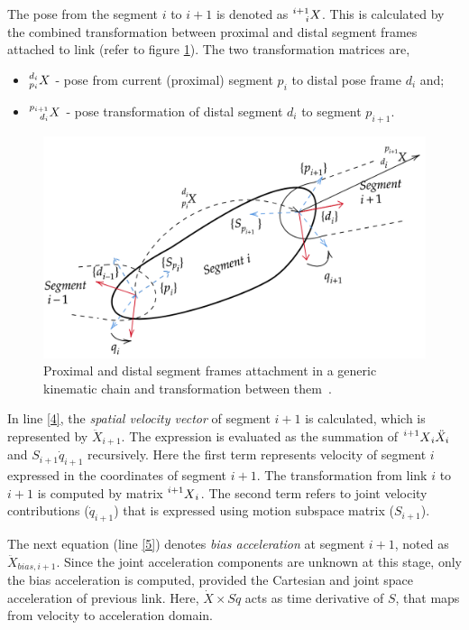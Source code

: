 The pose from the segment $i$ to $i+1$ is denoted as $\prescript{i+1}{i}{X}$. This is calculated by the combined transformation between proximal and distal segment frames attached to link (refer to figure \ref{fig:pose}). The two transformation matrices are, \begin{itemize}
	\item $\prescript{d_i}{p_i}{X}$ - pose from current (proximal) segment $p_i$ to distal pose frame $d_i$ and;
	\item $\prescript{p_{i+1}}{d_i}{X}$ - pose transformation of distal segment $d_i$ to segment $p_{i+1}$. 
\end{itemize} 

\begin{figure}[h!]
		\label{fig:pose}
	\centering
	\includegraphics[scale=0.33]{images/pose.png}
	\caption{Proximal and distal segment frames attachment in a generic kinematic chain and transformation between them~\cite{shakhimardanov2015composable}.}

\end{figure}

In line \ref{4}, the \textit{spatial velocity vector} of segment $i+1$ is calculated, which is represented by $\ddot{X}_{i+1}$. The expression is evaluated as the summation of $\prescript{i+1}{}{X}_i\ddot{X}_i$ and  $S_{i+1}\dot{q}_{i+1}$ recursively. Here the first term represents velocity of segment $i$ expressed in the coordinates of segment $i+1$. The transformation from link $i$ to $i+1$ is computed by matrix $\prescript{i+1}{}{X}_{i}$. The second term refers to joint velocity contributions ($\dot{q}_{i+1}$) that is expressed using motion subspace matrix ($S_{i+1}$).

	The next equation (line \ref{5}) denotes \textit{bias acceleration} at segment $i+1$, noted as $\ddot{X}_{bias, i+1}$. Since the joint acceleration components are unknown at this stage, only the bias acceleration is computed, provided the Cartesian and joint space acceleration of previous link. Here, $\dot{X} \times S \dot{q}$ acts as time derivative of $S$, that maps from velocity to acceleration domain. 

